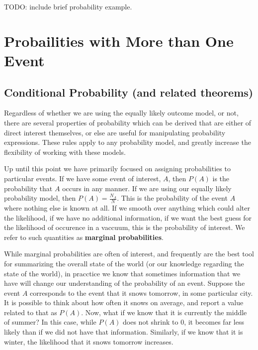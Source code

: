 \documentclass[
  letterpaper,
  DIV=11,
  numbers=noendperiod]{scrreprt}
\begin{document}
TODO: include brief probability example.

\chapter{Probailities with More than One
Event}\label{probailities-with-more-than-one-event}

\section{Conditional Probability (and related
theorems)}\label{conditional-probability-and-related-theorems}

Regardless of whether we are using the equally likely outcome model, or
not, there are several properties of probability which can be derived
that are either of direct interest themselves, or else are useful for
manipulating probability expressions. These rules apply to any
probability model, and greatly increase the flexibility of working with
these models.

Up until this point we have primarily focused on assigning probabilities
to particular events. If we have some event of interest, \(A\), then
\(P(A)\) is the probability that \(A\) occurs in any manner. If we are
using our equally likely probability model, then
\(P(A) = \frac{N_A}{N}\). This is the probability of the event \(A\)
where nothing else is known at all. If we smooth over anything which
could alter the likelihood, if we have no additional information, if we
want the best guess for the likelihood of occurence in a vaccuum, this
is the probability of interest. We refer to such quantities as
\textbf{marginal probabilities}.

While marginal probabilities are often of interest, and frequently are
the best tool for summarizing the overall state of the world (or our
knowledge regarding the state of the world), in pracctice we know that
sometimes information that we have will change our understanding of the
probability of an event. Suppose the event \(A\) corresponds to the
event that it snows tomorrow, in some particular city. It is possible to
think about how often it snows on average, and report a value related to
that as \(P(A)\). Now, what if we know that it is currently the middle
of summer? In this case, while \(P(A)\) does not shrink to \(0\), it
becomes far less likely than if we did not have that information.
Similarly, if we know that it is winter, the likelihood that it snows
tomorrow increases.
\end{document}
